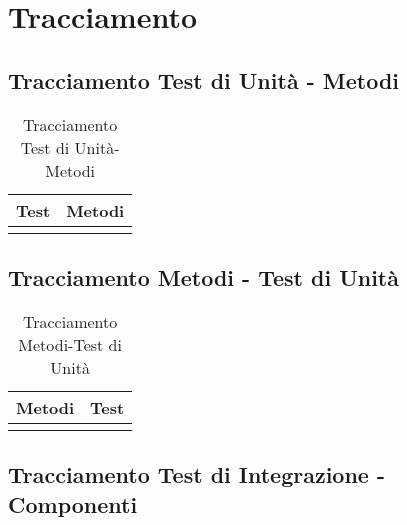 \newpage
\section{Tracciamento}

\subsection{Tracciamento Test di Unità - Metodi}

\normalsize
\begin{longtable}{|>{\centering}m{5cm}|m{5cm}<{\centering}|}
	\hline \rowcolor{Gray}
	\textbf{Test} & \textbf{Metodi}\\
	\hline
	\endhead
	
	\caption[Tracciamento Test di Unità-Metodi]{Tracciamento Test di Unità-Metodi}
	\label{tabella:tu-metodi}
\end{longtable}
\clearpage

\subsection{Tracciamento Metodi - Test di Unità}

\normalsize
\begin{longtable}{|>{\centering}m{5cm}|m{5cm}<{\centering}|}
	\hline \rowcolor{Gray}
	\textbf{Metodi} & \textbf{Test}\\
	\hline
	\endhead
	
	\caption[Tracciamento Metodi-Test di Unità]{Tracciamento Metodi-Test di Unità}
	\label{tabella:metodi-tu}
\end{longtable}
\clearpage

\subsection{Tracciamento Test di Integrazione - Componenti}

